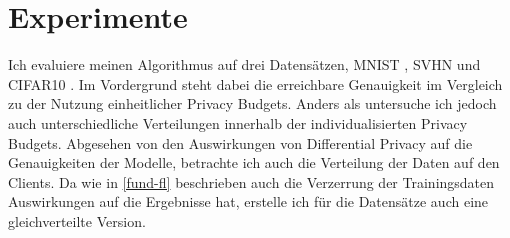 \chapter{Experimente}\label{chap:experiments}

Ich evaluiere meinen Algorithmus auf drei Datensätzen, MNIST \cite{lecun:1998}, SVHN \cite{netzer:2011} und CIFAR10 \cite{krizhevsky:2009}. Im Vordergrund steht dabei die erreichbare Genauigkeit im Vergleich zu der Nutzung einheitlicher Privacy Budgets. Anders als \textcite{aldaghri:2023} untersuche ich jedoch auch unterschiedliche Verteilungen innerhalb der individualisierten Privacy Budgets. Abgesehen von den Auswirkungen von Differential Privacy auf die Genauigkeiten der Modelle, betrachte ich auch die Verteilung der Daten auf den Clients. Da wie in \autoref{fund-fl} beschrieben auch die Verzerrung der Trainingsdaten Auswirkungen auf die Ergebnisse hat, erstelle ich für die Datensätze auch eine gleichverteilte Version.

